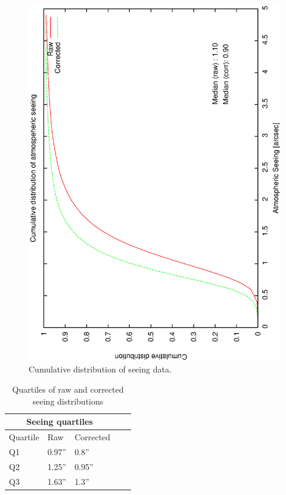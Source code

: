 {{\begin{figure}[htbp]
\begin{center}
    \includegraphics[scale=0.4, angle=-90]{figures/ecs/cum_seeing_dist.eps}
\end{center}  
\caption[Cumulative distribution of seeing data.]
{Cumulative distribution of seeing data.}
\label{fig:see_cum_dist}
\end{figure}


\begin{table}[htbp]
\begin{center}
\begin{tabular}{lllll}
\toprule
\multicolumn{3}{c}{Seeing quartiles} \\
\midrule
Quartile & Raw & Corrected \\
\midrule
Q1 & 0.97'' & 0.8''  \\
Q2 & 1.25'' & 0.95'' \\
Q3 & 1.63'' & 1.3''  \\
\bottomrule
\end{tabular}
\end{center}
\caption[Quartiles of raw and corrected seeing distributions]
{Quartiles of raw and corrected seeing distributions}
\label{tab:seeing_quartiles}
\end{table}

}}
